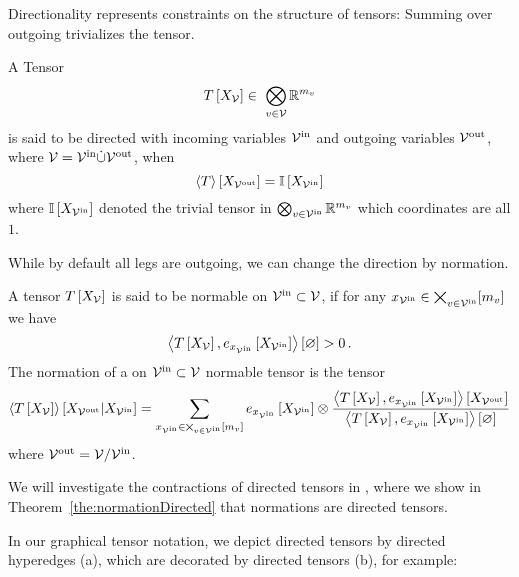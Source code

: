 Directionality represents constraints on the structure of tensors:
Summing over outgoing trivializes the tensor.

\begin{definition}\label{def:directedTensor}
	A Tensor 
		\[ \hypercoreat{\nodevariables} \in \bigotimes_{\nodein}\rr^{\catdimof{\node}} \]
	is said to be directed with incoming variables $\mathcal{V}^{\mathrm{in}}$ and outgoing variables $\mathcal{V}^{\mathrm{out}}$, where $\mathcal{V}=\mathcal{V}^{\mathrm{in}}\dot{\cup}\mathcal{V}^{\mathrm{out}}$, when
		\[ \left\langle T\right\rangle \left[ X_{\mathcal{V}^{\mathrm{out}}} \right] =  \mathbb{I}\left[X_{\mathcal{V}^{\mathrm{in}}}\right] \]
	where $\mathbb{I}\left[X_{\mathcal{V}^{\mathrm{in}}}\right]$ denoted the trivial tensor in  $\bigotimes_{v\in\mathcal{V}^{\mathrm{in}}}\mathbb{R}^{m_{v}}$ which coordinates are all $1$.
\end{definition}

While by default all legs are outgoing, we can change the direction by normation.

\begin{definition}\label{def:normation}
	A tensor $T\left[X_{\mathcal{V}}\right]$ is said to be normable on $\mathcal{V}^{\mathrm{in}}\subset\mathcal{V}$, if for any $x_{\mathcal{V}^{\mathrm{in}}}\in\bigtimes_{v\in\mathcal{V}^{\mathrm{in}}}[m_{v}]$ we have
		\[ \left\langle T\left[X_{\mathcal{V}}\right],e_{x_{\mathcal{V}^{\mathrm{in}}}}\left[X_{\mathcal{V}^{\mathrm{in}}}\right]\right\rangle \left[ \varnothing \right] > 0 \, . \]
	The normation of a on $\mathcal{V}^{\mathrm{in}}\subset\mathcal{V}$ normable tensor is the tensor
	\begin{align*}
		\left\langle T\left[X_{\mathcal{V}}\right]\right\rangle \left[ X_{\mathcal{V}^{\mathrm{out}}} | X_{\mathcal{V}^{\mathrm{in}}} \right] = 
		\sum_{x_{\mathcal{V}^{\mathrm{in}}}\in\bigtimes_{v\in\mathcal{V}^{\mathrm{in}}}[m_{v}]} 
		e_{x_{\mathcal{V}^{\mathrm{in}}}}\left[X_{\mathcal{V}^{\mathrm{in}}}\right] \otimes \frac{
		\left\langle T\left[X_{\mathcal{V}}\right],e_{x_{\mathcal{V}^{\mathrm{in}}}}\left[X_{\mathcal{V}^{\mathrm{in}}}\right]\right\rangle \left[ X_{\mathcal{V}^{\mathrm{out}}} \right]
		}{
		\left\langle T\left[X_{\mathcal{V}}\right],e_{x_{\mathcal{V}^{\mathrm{in}}}}\left[X_{\mathcal{V}^{\mathrm{in}}}\right]\right\rangle \left[ \varnothing \right]
		} 
	\end{align*}
	where $\mathcal{V}^{\mathrm{out}} = \mathcal{V}/\mathcal{V}^{\mathrm{in}}$.
\end{definition}

We will investigate the contractions of directed tensors in , where we show in Theorem~\ref{the:normationDirected} that normations are directed tensors.


In our graphical tensor notation, we depict directed tensors by directed hyperedges (a), which are decorated by directed tensors (b), for example:
	\begin{center}
		
	\end{center}



